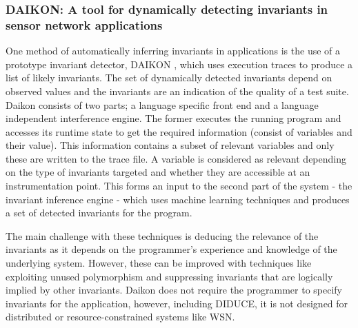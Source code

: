 \subsubsection*{DAIKON: A tool for dynamically detecting invariants in sensor network applications}

One method of automatically inferring invariants in applications is the use of a prototype invariant detector, DAIKON \cite{daikon}, which uses execution traces to produce a list of likely invariants. The set of dynamically detected invariants depend on observed values and the invariants are an indication of the quality of a test suite. Daikon consists of two parts; a language specific front end and a language independent interference engine. The former executes the running program and accesses its runtime state to get the required information (consist of variables and their value). This information contains a subset of relevant variables and only these are written to the trace file. A variable is considered as relevant depending on the type of invariants targeted and whether they are accessible at an instrumentation point. This forms an input to the second part of the system - the invariant inference engine - which uses machine learning techniques and produces a set of detected invariants for the program.

The main challenge with these techniques is deducing the relevance of the invariants as it depends on the programmer's experience and knowledge of the underlying system. However, these can be improved with techniques like exploiting unused polymorphism and suppressing invariants that are logically implied by other invariants. Daikon does not require the programmer to specify invariants for the application, however, including DIDUCE, it is not designed for distributed or resource-constrained systems like WSN.


